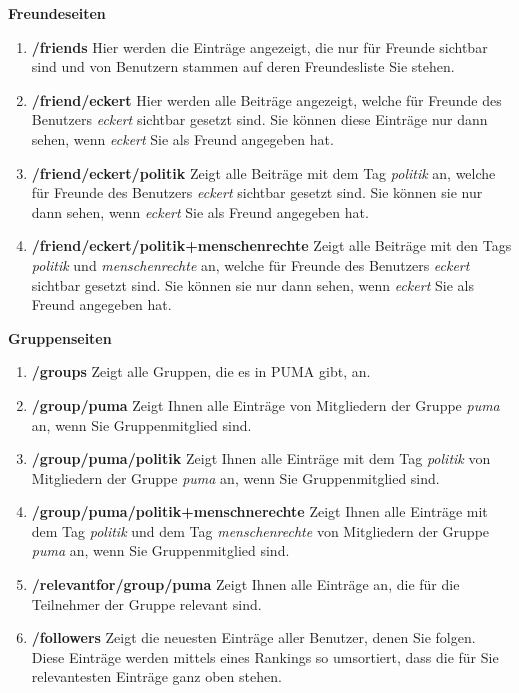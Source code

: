 \textbf{Freundeseiten} 
\begin{enumerate}
    \item \textbf{/friends} \newline
    Hier werden die Einträge angezeigt, die nur für Freunde sichtbar sind und von Benutzern stammen auf deren Freundesliste Sie stehen.
    \item \textbf{/friend/eckert} \newline
    Hier werden alle Beiträge angezeigt, welche für Freunde des Benutzers \textit{eckert} sichtbar gesetzt sind. Sie können diese Einträge nur dann sehen, wenn \textit{eckert} Sie als Freund angegeben hat.
    \item \textbf{/friend/eckert/politik} \newline
    Zeigt alle Beiträge mit dem Tag \textit{politik} an, welche für Freunde des Benutzers \textit{eckert} sichtbar gesetzt sind. Sie können sie nur dann sehen, wenn \textit{eckert} Sie als Freund angegeben hat.
    \item \textbf{/friend/eckert/politik+menschenrechte} \newline
    Zeigt alle Beiträge mit den Tags \textit{politik} und \textit{menschenrechte} an, welche für Freunde des Benutzers \textit{eckert} sichtbar gesetzt sind. Sie können sie nur dann sehen, wenn \textit{eckert} Sie als Freund angegeben hat.
\end{enumerate}
\textbf{Gruppenseiten}
\begin{enumerate}
    \item \textbf{/groups} \newline
    Zeigt alle Gruppen, die es in PUMA gibt, an.
    \item \textbf{/group/puma} \newline
    Zeigt Ihnen alle Einträge von Mitgliedern der Gruppe \textit{puma} an, wenn Sie Gruppenmitglied sind.
    \item \textbf{/group/puma/politik}\newline
    Zeigt Ihnen alle Einträge mit dem Tag \textit{politik} von Mitgliedern der Gruppe \textit{puma} an, wenn Sie Gruppenmitglied sind.
    \item \textbf{/group/puma/politik+menschnerechte}\newline
    Zeigt Ihnen alle Einträge mit dem Tag \textit{politik} und dem Tag \textit{menschenrechte} von Mitgliedern der Gruppe \textit{puma} an, wenn Sie Gruppenmitglied sind.
    \item \textbf{/relevantfor/group/puma} \newline
    Zeigt Ihnen alle Einträge an,  die für die Teilnehmer der Gruppe relevant sind.
    \item \textbf{/followers} \newline
    Zeigt die neuesten Einträge aller Benutzer, denen Sie folgen. Diese Einträge werden mittels eines Rankings so umsortiert, dass die für Sie relevantesten Einträge ganz oben stehen. %
\end{enumerate}
